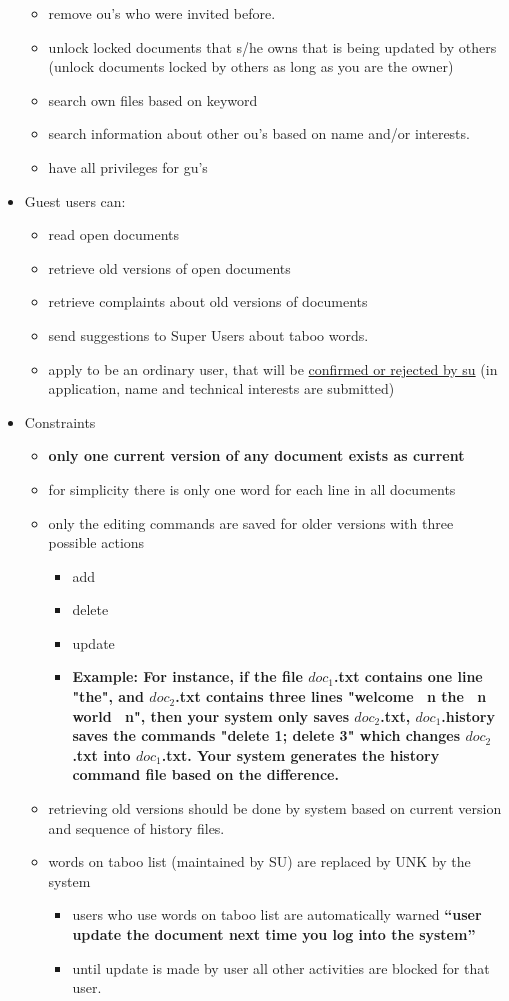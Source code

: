 \documentclass{article}
\begin{document}
\begin{itemize}
\begin{itemize}
			\item remove ou's who were invited before.
			\item unlock locked documents that s/he owns that is being updated by others (unlock documents locked by others as long as you are the owner)
			\item search own files based on keyword
			\item search information about other ou's based on name and/or interests.
			\item have all privileges for gu's
		\end{itemize}
		\item Guest users can:
		\begin{itemize}
			\item read open documents
			\item retrieve old versions of open documents
			\item retrieve complaints about old versions of documents
			\item send suggestions to Super Users about taboo words.
			\item apply to be an ordinary user, that will be \underline{confirmed or rejected by su} (in application, name and technical interests are submitted)
		\end{itemize}
		\item Constraints
		\begin{itemize}
			\item \textbf{only one current version of any document exists as current}
			\item for simplicity there is only one word for each line in all documents
			\item only the editing commands are saved for older versions with three possible actions
			\begin{itemize}
				\item add
				\item delete
				\item update
				\item \textbf{Example: For instance, if the file $doc_1$.txt contains one line "the", and $doc_2$.txt contains three lines "welcome \ n the \ n world \ n", then your system only saves $doc_2$.txt, $doc_1$.history saves the commands "delete 1; delete 3" which changes $doc_2$.txt into $doc_1$.txt. Your system generates the history command file based on the difference.}
			\end{itemize}
				\item retrieving old versions should be done by system based on current version and sequence of history files.
				\item words on taboo list (maintained by SU) are replaced by UNK by the system
				\begin{itemize}
					\item users who use words on taboo list are automatically warned \textbf{``user update the document next time you log into the system''} 
					\item until update is made by user all other activities are blocked for that user.
				\end{itemize}
		\end{itemize}
	
		
	\end{itemize}
\end{document}

